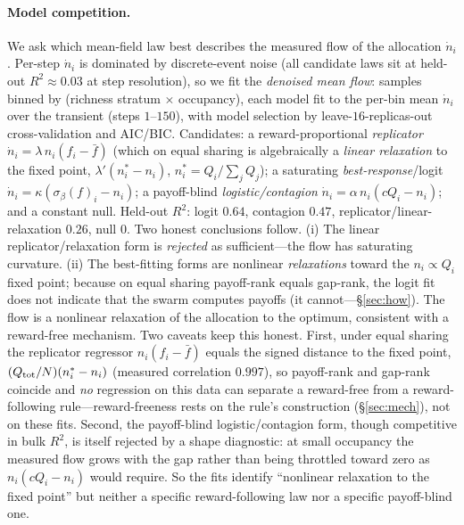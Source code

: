\documentclass{article}
\begin{document}
\paragraph{Model competition.} We ask which mean-field law best describes the measured flow of the allocation
$\dot n_i$. Per-step $\dot n_i$ is dominated by discrete-event noise (all candidate laws sit at held-out
$R^2\approx0.03$ at step resolution), so we fit the \emph{denoised mean flow}: samples binned by
(richness stratum $\times$ occupancy), each model fit to the per-bin mean $\dot n_i$ over the transient
(steps $1$--$150$), with model selection by leave-$16$-replicas-out cross-validation and AIC/BIC. Candidates:
a reward-proportional \emph{replicator} $\dot n_i=\lambda\,n_i(f_i-\bar f)$ (which on equal sharing is
algebraically a \emph{linear relaxation} to the fixed point, $\lambda'(n_i^*-n_i)$, $n_i^*=Q_i/\sum_jQ_j$);
a saturating \emph{best-response}/logit $\dot n_i=\kappa(\sigma_\beta(f)_i-n_i)$; a payoff-blind
\emph{logistic/contagion} $\dot n_i=\alpha\,n_i(cQ_i-n_i)$; and a constant null. Held-out $R^2$: logit
$0.64$, contagion $0.47$, replicator/linear-relaxation $0.26$, null $0$. Two honest conclusions follow. (i) The
linear replicator/relaxation form is \emph{rejected} as sufficient---the flow has saturating curvature. (ii)
The best-fitting forms are nonlinear \emph{relaxations} toward the $n_i\propto Q_i$ fixed point; because on
equal sharing payoff-rank equals gap-rank, the logit fit does not indicate that the swarm computes payoffs (it
cannot---\S\ref{sec:how}). The flow is a nonlinear relaxation of the allocation to the optimum, consistent with
a reward-free mechanism. Two caveats keep this honest. First, under equal sharing the replicator regressor
$n_i(f_i-\bar f)$ equals the signed distance to the fixed point, $(Q_{\rm tot}/N)(n_i^*-n_i)$ (measured
correlation $0.997$), so payoff-rank and gap-rank coincide and \emph{no} regression on this data can separate a
reward-free from a reward-following rule---reward-freeness rests on the rule's construction (\S\ref{sec:mech}),
not on these fits. Second, the payoff-blind logistic/contagion form, though competitive in bulk $R^2$, is
itself rejected by a shape diagnostic: at small occupancy the measured flow grows with the gap rather than
being throttled toward zero as $n_i(cQ_i-n_i)$ would require. So the fits identify ``nonlinear relaxation to
the fixed point'' but neither a specific reward-following law nor a specific payoff-blind one.
\end{document}
